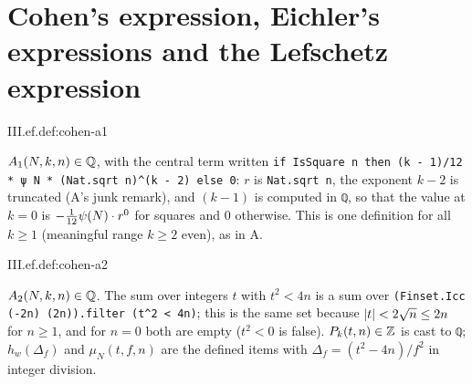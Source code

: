 \section{Cohen's expression, Eichler's expressions and the Lefschetz expression}\label{sec:ef-expressions}

\begin{definition}
\end{definition}
\begin{tfformal}{III.ef.def:cohen-a1}
\begin{tffidelity}
$A_1(N,k,n)\in\mathbb{Q}$, with the central term written \texttt{if IsSquare n then (k - 1)/12 * ψ N * (Nat.sqrt n)\^{}(k - 2) else 0}: $r$ is \texttt{Nat.sqrt n}, the exponent $k-2$ is truncated (A's junk remark), and $(k-1)$ is computed in \texttt{ℚ}, so that the value at $k=0$ is $-\tfrac1{12}\psi(N)\cdot r^0$ for squares and $0$ otherwise. This is one definition for all $k\ge1$ (meaningful range $k\ge2$ even), as in A.
\end{tffidelity}
\end{tfformal}

\begin{definition}
\end{definition}
\begin{tfformal}{III.ef.def:cohen-a2}
\begin{tffidelity}
$A_2(N,k,n)\in\mathbb{Q}$. The sum over integers $t$ with $t^2<4n$ is a sum over \texttt{(Finset.Icc (-2n) (2n)).filter (t\^{}2 < 4n)}; this is the same set because $\lvert t\rvert<2\sqrt n\le2n$ for $n\ge1$, and for $n=0$ both are empty ($t^2<0$ is false). $P_k(t,n)\in\mathbb{Z}$ is cast to \texttt{ℚ}; $h_w(\Delta_f)$ and $\mu_N(t,f,n)$ are the defined items with $\Delta_f=(t^2-4n)/f^2$ in integer division.
\end{tffidelity}
\end{tfformal}

